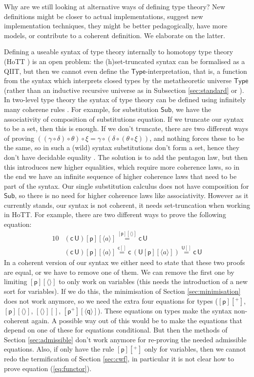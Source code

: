 \documentclass[sigplan,10pt,anonymous,review]{acmart}\settopmatter{printfolios=true,printccs=false,printacmref=false}
\newcommand{\Sub}{\mathsf{Sub}}
\newcommand{\p}{\mathsf{p}}
\newcommand{\q}{\mathsf{q}}
\newcommand{\U}{\mathsf{U}}
\newcommand{\cd}{\mathsf{c}}
\newcommand{\Type}{\mathsf{Type}}
\begin{document}
Why are we still looking at alternative ways of defining type theory?
New definitions might be closer to actual implementations, suggest new
implementation techniques, they might be better pedagogically, have
more models, or contribute to a coherent definition. We elaborate on
the latter.

Defining a useable syntax of type theory internally to homotopy type
theory (HoTT \cite{HoTTbook}) is an open problem: the (h)set-truncated
syntax can be formalised as a QIIT, but then we cannot even define the
$\Type$-interpretation, that is, a function from the syntax which
interprets closed types by the metatheoretic universe $\Type$ (rather
than an inductive recursive universe as in Subsection
\ref{sec:standard} or \cite[Section
  4]{DBLP:conf/popl/AltenkirchK16}). In two-level type theory the
syntax of type theory can be defined using infinitely many coherene
rules \cite{DBLP:conf/lics/Kraus21}. For example, for substitution
$\Sub$, we have the associativity of composition of substitutions
equation. If we truncate our syntax to be a set, then this is
enough. If we don't truncate, there are two different ways of proving
$((\gamma\circ\delta)\circ\theta)\circ\xi =
\gamma\circ(\delta\circ(\theta\circ\xi))$, and nothing forces these to
be the same, so in such a (wild) syntax substitutions don't form a
set, hence they don't have decidable equality \cite{hedberg}. The
solution is to add the pentagon law, but then this introduces new
higher equalities, which require more coherence laws, so in the end we
have an infinite sequence of higher coherence laws that need to be
part of the syntax. Our single substitution calculus does not have
composition for $\Sub$, so there is no need for higher coherence laws
like associativity. However as it currently stands, our syntax is not
coherent, it needs set-truncation when working in HoTT. For example,
there are two different ways to prove the following equation:
\begin{alignat*}{10}
  & (\cd\,\U)[\p][\langle a\rangle] \overset{[\p][\langle\rangle]}{=} \cd\,\U \\
  & (\cd\,\U)[\p][\langle a\rangle] \overset{\cd[]}{=} \cd\,(\U[\p][\langle a\rangle]) \overset{\U[]}{=} \cd\,\U
\end{alignat*}
In a coherent version of our syntax we either need to state that these
two proofs are equal, or we have to remove one of them. We can remove
the first one by limiting $[\p][\langle\rangle]$ to only work on
variables (this needs the introduction of a new sort for
variables). If we do this, the minimisation of Section
\ref{sec:minimisation} does not work anymore, so we need the extra
four equations for types ($[\p][^+]$, $[\p][\langle\rangle]$,
$[\langle\rangle][]$, $[\p^+][\langle\q\rangle]$). These equations on
types make the syntax non-coherent again. A possible way out of this
would be to make the equations that depend on one of these for
equations conditional. But then the methods of Section
\ref{sec:admissible} don't work anymore for re-proving the needed
admissible equations. Also, if only have the rule $[\p][^+]$ only for
variables, then we cannot redo the termification of Section
\ref{sec:cwf}, in particular it is not clear how to prove equation
(\ref{eq:functor}).
\end{document}
